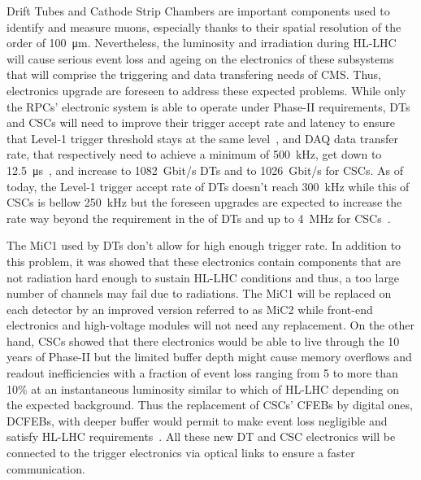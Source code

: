 	Drift Tubes and Cathode Strip Chambers are important components used to identify and measure muons, especially thanks to their spatial resolution of the order of \SI{100}{\micro m}. Nevertheless, the luminosity and irradiation during HL-LHC will cause serious event loss and ageing on the electronics of these subsystems that will comprise the triggering and data transfering needs of CMS. Thus, electronics upgrade are foreseen to address these expected problems. While only the RPCs' electronic system is able to operate under Phase-II requirements, DTs and CSCs will need to improve their trigger accept rate and latency to ensure that Level-1 trigger threshold stays at the same level~\cite{LEVEL1IR}, and DAQ data transfer rate, that respectively need to achieve a minimum of \SI{500}{kHz}, get down to \SI{12.5}{\micro s}~\cite{CMSIITP}, and increase to \SI{1082}{Gbit/s} DTs and to \SI{1026}{Gbit/s} for CSCs. As of today, the Level-1 trigger accept rate of DTs doesn't reach \SI{300}{kHz} while this of CSCs is bellow \SI{250}{kHz} but the foreseen upgrades are expected to increase the rate way beyond the requirement in the of DTs and up to \SI{4}{MHz} for CSCs~\cite{PHASEIITP}.
	
	The \acf{MiC1} used by DTs don't allow for high enough trigger rate. In addition to this problem, it was showed that these electronics contain components that are not radiation hard enough to sustain HL-LHC conditions and thus, a too large number of channels may fail due to radiations. The MiC1 will be replaced on each detector by an improved version referred to as MiC2 while front-end electronics and high-voltage modules will not need any replacement. On the other hand, CSCs showed that there electronics would be able to live through the 10 years of Phase-II but the limited buffer depth might cause memory overflows and readout inefficiencies with a fraction of event loss ranging from 5 to more than 10\% at an instantaneous luminosity similar to which of HL-LHC depending on the expected background. Thus the replacement of CSCs' \acf{CFEBs} by digital ones, DCFEBs, with deeper buffer would permit to make event loss negligible and satisfy HL-LHC requirements~\cite{PHASEIITP}. All these new DT and CSC electronics will be connected to the trigger electronics via optical links to ensure a faster communication.
	
